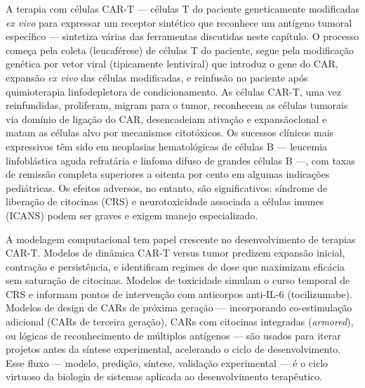 A terapia com células CAR-T --- células T do paciente geneticamente modificadas \emph{ex vivo} para expressar um receptor sintético que reconhece um antígeno tumoral específico --- sintetiza várias das ferramentas discutidas neste capítulo. O processo começa pela coleta (leucaférese) de células T do paciente, segue pela modificação genética por vetor viral (tipicamente lentiviral) que introduz o gene do CAR, expansão \emph{ex vivo} das células modificadas, e reinfusão no paciente após quimioterapia linfodepletora de condicionamento. As células CAR-T, uma vez reinfundidas, proliferam, migram para o tumor, reconhecem as células tumorais via domínio de ligação do CAR, desencadeiam ativação e expansãoclonal e matam as células alvo por mecanismos citotóxicos. Os sucessos clínicos mais expressivos têm sido em neoplasias hematológicas de células B --- leucemia linfoblástica aguda refratária e linfoma difuso de grandes células B ---, com taxas de remissão completa superiores a oitenta por cento em algumas indicações pediátricas. Os efeitos adversos, no entanto, são significativos: síndrome de liberação de citocinas (CRS) e neurotoxicidade associada a células imunes (ICANS) podem ser graves e exigem manejo especializado.

A modelagem computacional tem papel crescente no desenvolvimento de terapias CAR-T. Modelos de dinâmica CAR-T versus tumor predizem expansão inicial, contração e persistência, e identificam regimes de dose que maximizam eficácia sem saturação de citocinas. Modelos de toxicidade simulam o curso temporal de CRS e informam pontos de intervenção com anticorpos anti-IL-6 (tocilizumabe). Modelos de design de CARs de próxima geração --- incorporando co-estimulação adicional (CARs de terceira geração), CARs com citocinas integradas (\emph{armored}), ou lógicas de reconhecimento de múltiplos antígenos --- são usados para iterar projetos antes da síntese experimental, acelerando o ciclo de desenvolvimento. Esse fluxo --- modelo, predição, síntese, validação experimental --- é o ciclo virtuoso da biologia de sistemas aplicada ao desenvolvimento terapêutico.

